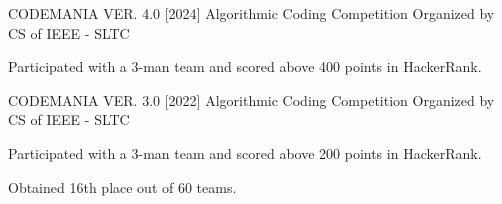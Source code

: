 

\begin{cventries}

  \cventry
    {CODEMANIA VER. 4.0 [2024]} %
    {Algorithmic Coding Competition Organized by CS of IEEE - SLTC} %
    {} %
    {} %
    {
      \begin{cvitems} %
        \item Participated with a 3-man team and scored above 400 points in HackerRank.
      \end{cvitems}
    }
  \cventry
  {CODEMANIA VER. 3.0 [2022]} %
  {Algorithmic Coding Competition Organized by CS of IEEE - SLTC} %
  {} %
  {} %
  {
    \begin{cvitems} %
      \item Participated with a 3-man team and scored above 200 points in HackerRank.
      \item Obtained 16th place out of 60 teams.
    \end{cvitems}
  }

\end{cventries}
